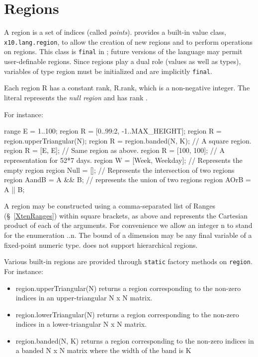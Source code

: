 \section{Regions}\label{XtenRegions}

A region is a set of indices (called {\em points}).  
{}\Xten{} provides a built-in value class, {\tt
x10.lang.region}, to allow the creation of new regions and
to perform operations on regions. This class is {\tt final} in
{}\XtenCurrVer; future versions of the language may permit
user-definable regions. Since regions play a dual role
(values as well as types), variables of type {\cf region} 
must be initialized and are implicitly {\tt final}.

Each region {\cf R} has a constant rank, {\cf R.rank}, which is a
non-negative integer. The literal {\cf []} represents the {\em null
region} and has rank {}.

For instance:
\begin{x10}
   range  E = 1..100;
   region R = [0..99:2, -1..MAX\_HEIGHT];   
   region R = region.upperTriangular(N);
   region R = region.banded(N, K);
     // A square region.
   region R = [E, E];           
     // Same region as above.
   region R = [100, 100];       
     // A representation for 52*7 days.
   region W = [Week, Weekday];  
     // Represents  the empty region
   region Null = [];            
     // Represents the intersection of two regions
   region AandB = A \&\& B;       
     // represents the union of two regions
   region AOrB = A || B;        
\end{x10}

A region may be constructed using a comma-separated list of {\cf
Ranges} (\S~\ref{XtenRanges}) within square brackets, as above and
represents the Cartesian product of each of the arguments.  For
convenience we allow an integer {\cf n} to stand for the enumeration
{..n}.  The bound of a dimension may be any
final variable of a fixed-point numeric type. \XtenCurrVer{} does not
support hierarchical regions.

Various built-in regions are provided through {\tt static} factory
methods on {\tt region}.  For instance:
\begin{itemize}
{}\item {\cf region.upperTriangular(N)} returns a region corresponding
to the non-zero indices in an upper-triangular {\cf N x N} matrix.
{}\item {\cf region.lowerTriangular(N)} returns a region corresponding
to the non-zero indices in a lower-triangular {\cf N x N} matrix.
{}\item {\cf region.banded(N, K)} returns a region corresponding to
the non-zero indices in a banded {\cf N x N} matrix where the width of
the band is {\cf K}
\end{itemize}

